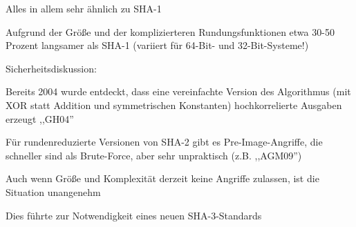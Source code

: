 \documentclass[a4paper]{article}
\begin{document}
\begin{multicols}{3}
\begin{itemize*}
\begin{itemize*}
                  \item Alles in allem sehr ähnlich zu SHA-1
                  \item Aufgrund der Größe und der komplizierteren Rundungsfunktionen etwa 30-50 Prozent langsamer als SHA-1 (variiert für 64-Bit- und 32-Bit-Systeme!)
                  \item Sicherheitsdiskussion:
                  \begin{itemize*}
                        \item Bereits 2004 wurde entdeckt, dass eine vereinfachte Version des Algorithmus (mit XOR statt Addition und symmetrischen Konstanten) hochkorrelierte Ausgaben erzeugt ,,GH04''
                        \item Für rundenreduzierte Versionen von SHA-2 gibt es Pre-Image-Angriffe, die schneller sind als Brute-Force, aber sehr unpraktisch (z.B. ,,AGM09'')
                        \item Auch wenn Größe und Komplexität derzeit keine Angriffe zulassen, ist die Situation unangenehm
                        \item Dies führte zur Notwendigkeit eines neuen SHA-3-Standards
                  \end{itemize*}
            \end{itemize*}
      \end{itemize*}


\end{multicols}
\end{document}

